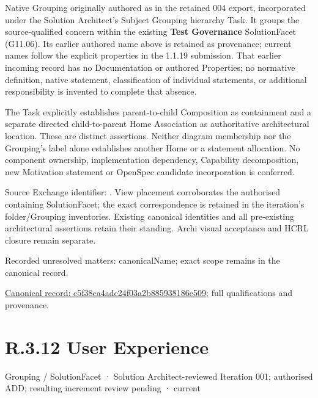 Native Grouping originally authored as \texttt{} in the retained 004 export,
incorporated under the Solution Architect's Subject Grouping hierarchy Task.
It groups the source-qualified \texttt{} concern within
the existing \textbf{Test Governance} SolutionFacet (G11.06). Its earlier authored name above is retained as provenance; current names
follow the explicit properties in the 1.1.19 submission.
That earlier incoming record has no Documentation or authored Properties; no normative
definition, native statement, classification of individual statements, or
additional responsibility is invented to complete that absence.



The Task explicitly establishes parent-to-child Composition as containment and
a separate directed child-to-parent Home Association as authoritative architectural
location. These are distinct assertions. Neither diagram membership nor the
Grouping's label alone establishes another Home or a statement allocation.
No component ownership, implementation dependency, Capability decomposition,
new Motivation statement or OpenSpec candidate incorporation is conferred.



Source Exchange identifier: \texttt{}. View placement corroborates
the authorised containing SolutionFacet; the exact correspondence is retained in the
iteration's folder/Grouping inventories. Existing canonical identities and all
pre-existing architectural assertions retain their standing. Archi visual
acceptance and HCRL closure remain separate.


{\small Recorded unresolved matters: canonicalName; exact scope remains in the canonical record.}\par
{\footnotesize \href{../../../../../../../continuum/grouping/c5f38ca4adc24f03a2b885938186e509.md}{Canonical record: c5f38ca4adc24f03a2b885938186e509}; full qualifications and provenance.}\par
\section*{R.3.12 User Experience}
\label{navigation:R.3.12}

\label{element:1c57a3d9080443178f6e9159d0591c77}
{\small Grouping / SolutionFacet · Solution Architect-reviewed Iteration 001; authorised ADD; resulting increment review pending · current}\par


